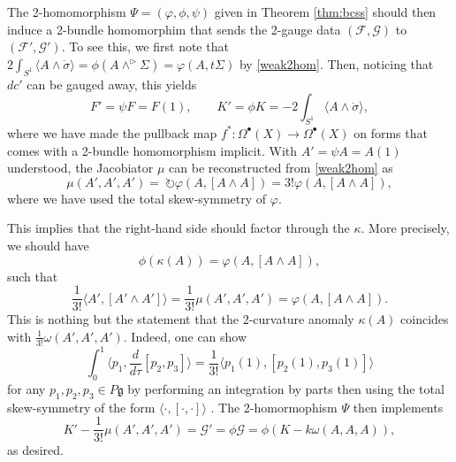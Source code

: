 \documentclass[onecolumn]{article}
\theoremstyle{theorem}
\theoremstyle{remark}
\theoremstyle{example}
\theoremstyle{definition}
\numberwithin{equation}{section}
\def\g{\mathfrak g}
\begin{document}
The 2-homomorphism $\Psi=(\varphi,\phi,\psi)$ given in {Theorem \ref{thm:bcss}} should then induce a 2-bundle homomorphim that sends the 2-gauge data $(\mathcal{F},\mathcal{G})$ to $(\mathcal{F}',\mathcal{G}')$. To see this, we first note that $2\int_{S^1}\langle A\wedge\dot\sigma\rangle = \phi(A\wedge^\rhd \Sigma) = \varphi(A,t\Sigma)$ by  \eqref{weak2hom}. Then, noticing that $dc'$ can be gauged away, this yields
\begin{equation}
    F' = \psi F = F(1),\qquad  K' = \phi K = -2\int_{S^1}\langle A\wedge\dot\sigma\rangle,\label{eq:curvdata}
\end{equation}
where we have made the pullback map $f^*:\Omega^\bullet(X)\rightarrow\Omega^\bullet(X)$ on forms that comes with a 2-bundle homomorphism implicit. With $A' = \psi A = A(1)$ understood, the Jacobiator $\mu$ can be reconstructed from  \eqref{weak2hom} as
\begin{equation}
    \mu(A',A',A') =~ \circlearrowright\varphi(A,[A\wedge A])= 3!\varphi(A,[A\wedge A]),\nonumber
\end{equation}
where we have used the total skew-symmetry of $\varphi$.

This implies that the right-hand side should factor through the $\kappa$. More precisely, we should have
\begin{equation}
    \phi(\kappa(A)) = \varphi(A,[A\wedge A]),\nonumber
\end{equation}
such that
\begin{equation}
    \frac{1}{3!}\langle A',[A'\wedge A']\rangle = \frac{1}{3!}\mu(A',A',A') = \varphi(A,[A\wedge A]).\nonumber
\end{equation}
{This} is nothing but the statement that the 2-curvature anomaly $\kappa(A)$ coincides with $\frac{1}{3!}\omega(A',A',A')$. Indeed, one can show
\begin{equation}
    \int_0^1\langle p_1,\frac{d}{d\tau}[p_2,p_3]\rangle =\frac{1}{3!}\langle p_1(1),[p_2(1),p_3(1)]\rangle \nonumber
\end{equation}
for any $p_1,p_2,p_3\in P\g$ by performing an integration by parts then using the total skew-symmetry of the form $\langle\cdot,[\cdot,\cdot]\rangle$ \cite{Baez:2005sn}. The 2-homormophism $\Psi$ then implements
\begin{equation}
    K' - \frac{1}{3!}\mu(A',A',A') = \mathcal{G}' = \phi\mathcal{G} = \phi(K-k\omega(A,A,A)),\nonumber
\end{equation}
as desired.
\end{document}
